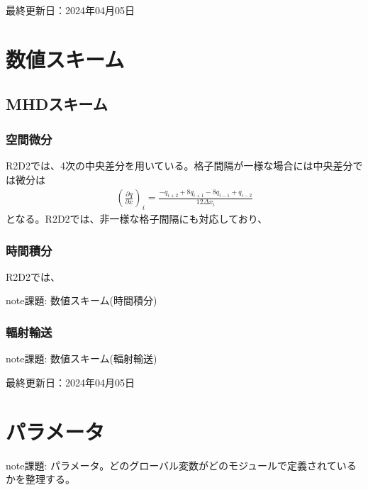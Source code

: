 \documentclass[letterpaper,10pt,dvipdfmx,report]{sphinxmanual}
\begin{document}
\sphinxAtStartPar
最終更新日：2024年04月05日

\sphinxstepscope


\chapter{数値スキーム}
\label{\detokenize{scheme:id1}}\label{\detokenize{scheme::doc}}

\section{MHDスキーム}
\label{\detokenize{scheme:mhd}}

\subsection{空間微分}
\label{\detokenize{scheme:id2}}
\sphinxAtStartPar
R2D2では、4次の中央差分を用いている。格子間隔が一様な場合には中央差分では微分は
\begin{equation*}
\begin{split}\left(\frac{\partial q}{\partial x}\right)_i =\frac{-q_{i+2}+8q_{i+1}-8q_{i-1}+q_{i-2}}{12\Delta x_i}\end{split}
\end{equation*}
\sphinxAtStartPar
となる。R2D2では、非一様な格子間隔にも対応しており、


\subsection{時間積分}
\label{\detokenize{scheme:id3}}
\sphinxAtStartPar
R2D2では、

\begin{sphinxadmonition}{note}{\label{\detokenize{scheme:id4}}課題:}
\sphinxAtStartPar
数値スキーム(時間積分)
\end{sphinxadmonition}


\subsection{輻射輸送}
\label{\detokenize{scheme:id5}}
\begin{sphinxadmonition}{note}{\label{\detokenize{scheme:id6}}課題:}
\sphinxAtStartPar
数値スキーム(輻射輸送)
\end{sphinxadmonition}

\sphinxAtStartPar
最終更新日：2024年04月05日

\sphinxstepscope


\chapter{パラメータ}
\label{\detokenize{parameter:id1}}\label{\detokenize{parameter::doc}}
\begin{sphinxadmonition}{note}{\label{\detokenize{parameter:id2}}課題:}
\sphinxAtStartPar
パラメータ。どのグローバル変数がどのモジュールで定義されているかを整理する。
\end{sphinxadmonition}
\end{document}
